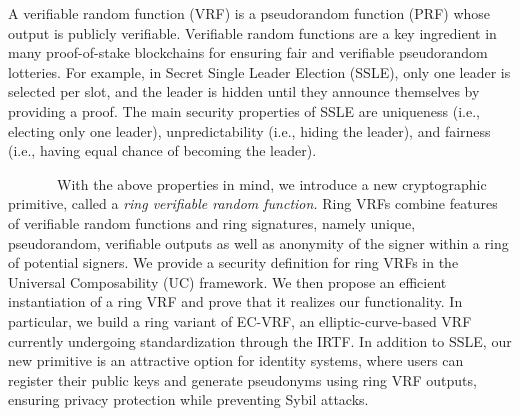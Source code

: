 

\def\eprintsmallskip{\smallskip}{}%
 A verifiable random function (VRF) is a pseudorandom function (PRF) whose output is publicly verifiable.
Verifiable random functions are a key ingredient in many proof-of-stake blockchains for ensuring fair and verifiable pseudorandom lotteries.
For example, in Secret Single Leader Election (SSLE), only one leader is selected per slot, and the
leader is hidden until they announce themselves by providing a proof.
The main security properties of SSLE are uniqueness (i.e., electing only one leader), unpredictability (i.e., hiding the leader), and fairness (i.e., having equal chance of becoming the leader).

~~~~~~~With the above properties in mind, we introduce a new cryptographic primitive, called a 
\emph{ring verifiable random function.}
Ring VRFs combine features of verifiable random functions and ring signatures, namely unique, pseudorandom, verifiable outputs as well as anonymity of the signer within a ring of potential signers.
We provide a security definition for ring VRFs in the Universal Composability (UC) framework.
We then propose an efficient instantiation of a ring VRF and prove that it realizes our functionality.
In particular, we build a ring variant of EC-VRF, an elliptic-curve-based VRF currently undergoing standardization through the IRTF. 
In addition to SSLE, our new primitive is an attractive option for identity systems, where users can register their public keys and generate pseudonyms using ring VRF outputs, ensuring privacy protection while preventing Sybil attacks.

